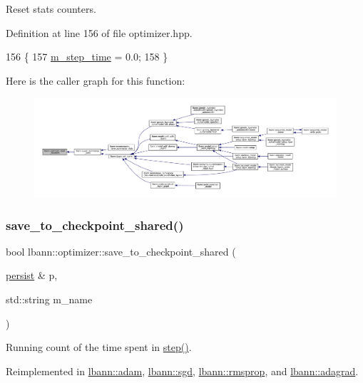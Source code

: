 Reset stats counters. 

Definition at line 156 of file optimizer.\+hpp.


\begin{DoxyCode}
156                                 \{
157     \hyperlink{classlbann_1_1optimizer_afc424c715008fb4d900548f7934ea856}{m\_step\_time} = 0.0;
158   \}
\end{DoxyCode}
Here is the caller graph for this function\+:\nopagebreak
\begin{figure}[H]
\begin{center}
\leavevmode
\includegraphics[width=350pt]{classlbann_1_1optimizer_a067709debd4d2e7bfe1a35b5f6ced668_icgraph}
\end{center}
\end{figure}
\mbox{\label{classlbann_1_1optimizer_afed10c6d8c5bd922f95075abeff711ce}} 
\subsubsection{\texorpdfstring{save\+\_\+to\+\_\+checkpoint\+\_\+shared()}{save\_to\_checkpoint\_shared()}}
{\footnotesize\ttfamily bool lbann\+::optimizer\+::save\+\_\+to\+\_\+checkpoint\+\_\+shared (\begin{DoxyParamCaption}\item[{\hyperlink{classlbann_1_1persist}{persist} \&}]{p,  }\item[{std\+::string}]{m\+\_\+name }\end{DoxyParamCaption})\hspace{0.3cm}{\ttfamily [virtual]}}

Running count of the time spent in \hyperlink{classlbann_1_1optimizer_aa9f43ca3f22edc0a25d0509b6514a411}{step()}. 

Reimplemented in \hyperlink{classlbann_1_1adam_a8070db0a451bdbc6e86200eaa14f6ac7}{lbann\+::adam}, \hyperlink{classlbann_1_1sgd_a78ad11ca7424d50a9f2ba29e5f725e21}{lbann\+::sgd}, \hyperlink{classlbann_1_1rmsprop_a8abe698168c2d1cb2c65d180552501ef}{lbann\+::rmsprop}, and \hyperlink{classlbann_1_1adagrad_a94282e58af6bb1e9af27255e23bd3d3d}{lbann\+::adagrad}.



